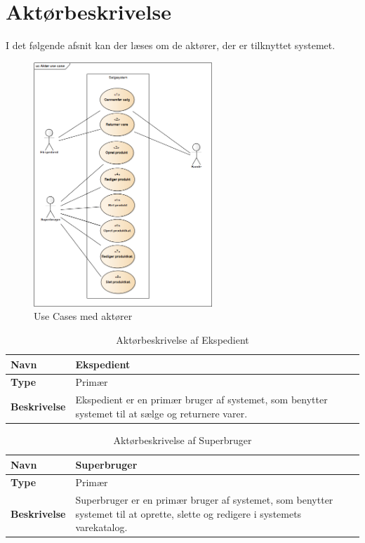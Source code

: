 \section{Aktørbeskrivelse}

I det følgende afsnit kan der læses om de aktører, der er tilknyttet systemet. \\

\begin{figure}[H]
	\centering
	\includegraphics[width=0.6\textwidth]{Krav/Images/AktorUC}
	\caption{Use Cases med aktører}
	\label{fig:ActorUC}
\end{figure}

\begin{table}[H]
	\label{EKS}
	\begin{tabularx}{\textwidth}{|l|X|}
		\hline
		\textbf{Navn} & Ekspedient \\
		\hline
		\textbf{Type} & Primær \\
		\hline
		\textbf{Beskrivelse} & Ekspedient er en primær bruger af systemet, som benytter systemet til at sælge og returnere varer. \\
		\hline
	\end{tabularx}
	\captionsetup{justification=raggedright,singlelinecheck=false}
	\caption{Aktørbeskrivelse af Ekspedient}
	\label{tab:AktEks}
\end{table}


\begin{table}[H]
	\begin{tabularx}{\textwidth}{|l|X|}
		\hline
		\textbf{Navn} & Superbruger \\
		\hline
		\textbf{Type} & Primær \\
		\hline
		\textbf{Beskrivelse} & Superbruger er en primær bruger af systemet, som benytter systemet til at oprette, slette og redigere i systemets varekatalog. \\
		\hline
	\end{tabularx}
	\captionsetup{justification=raggedright,singlelinecheck=false}
	\caption{Aktørbeskrivelse af Superbruger}
	\label{tab:AktSuu}
\end{table}

